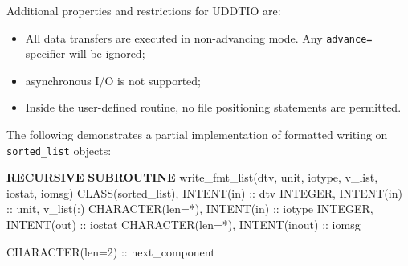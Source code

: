 \documentclass[
]{scrartcl}
\newenvironment{Shaded}{}{}
\newcommand{\DataTypeTok}[1]{\textcolor[rgb]{0.56,0.13,0.00}{#1}}
\newcommand{\KeywordTok}[1]{\textcolor[rgb]{0.00,0.44,0.13}{\textbf{#1}}}
\newcommand{\NormalTok}[1]{#1}
\providecommand{\tightlist}{%
  \setlength{\itemsep}{0pt}\setlength{\parskip}{0pt}}
\begin{document}
Additional properties and restrictions for UDDTIO are:

\begin{itemize}
\tightlist
\item
  All data transfers are executed in non-advancing mode. Any
  \texttt{advance=} specifier will be ignored;
\item
  asynchronous I/O is not supported;
\item
  Inside the user-defined routine, no file positioning statements are
  permitted.
\end{itemize}

The following demonstrates a partial implementation of formatted writing
on \texttt{sorted\_list} objects:

\begin{Shaded}
\begin{Highlighting}[]
\KeywordTok{RECURSIVE} \KeywordTok{SUBROUTINE}\NormalTok{ write\_fmt\_list(dtv, unit, iotype, v\_list, iostat, iomsg)}
   \DataTypeTok{CLASS(sorted\_list)}\NormalTok{, }\DataTypeTok{INTENT(in)} \DataTypeTok{::}\NormalTok{ dtv}
   \DataTypeTok{INTEGER}\NormalTok{, }\DataTypeTok{INTENT(in)} \DataTypeTok{::}\NormalTok{ unit, v\_list(:)}
   \DataTypeTok{CHARACTER(len=*)}\NormalTok{, }\DataTypeTok{INTENT(in)} \DataTypeTok{::}\NormalTok{ iotype}
   \DataTypeTok{INTEGER}\NormalTok{, }\DataTypeTok{INTENT(out)} \DataTypeTok{::}\NormalTok{ iostat}
   \DataTypeTok{CHARACTER(len=*)}\NormalTok{, }\DataTypeTok{INTENT(inout)} \DataTypeTok{::}\NormalTok{ iomsg}

   \DataTypeTok{CHARACTER(len=2)} \DataTypeTok{::}\NormalTok{ next\_component}


\end{Highlighting}
\end{Shaded}
\end{document}
